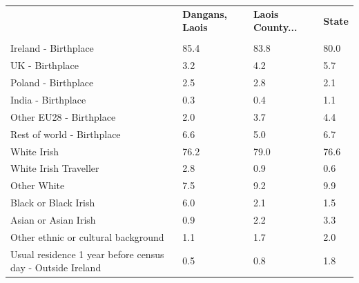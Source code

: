 \documentclass{article}
\begin{document}
\pagebreak
\begin{table}[h]	
\centering
		\begin{tabular}{KTTT}
  \hline
& \textbf{Dangans, Laois} & \textbf{Laois County...} & \textbf{State}\\ 
  \hline
    \\ 
    \hline
Ireland - Birthplace & 85.4& 83.8& 80.0\\
UK - Birthplace & 3.2& 4.2& 5.7\\
Poland - Birthplace & 2.5& 2.8& 2.1\\
India - Birthplace & 0.3& 0.4& 1.1\\
Other EU28 - Birthplace & 2.0& 3.7& 4.4\\
Rest of world - Birthplace & 6.6& 5.0& 6.7\\
    \hline
White Irish & 76.2& 79.0& 76.6\\
White Irish Traveller & 2.8& 0.9& 0.6\\
Other White & 7.5& 9.2& 9.9\\
Black or Black Irish & 6.0& 2.1& 1.5\\
Asian or Asian Irish & 0.9& 2.2& 3.3\\
Other ethnic or cultural background & 1.1& 1.7& 2.0\\
    \hline
Usual residence 1 year before census day - Outside Ireland & 0.5& 0.8& 1.8\\


\end{tabular}
\end{table}
\end{document}
